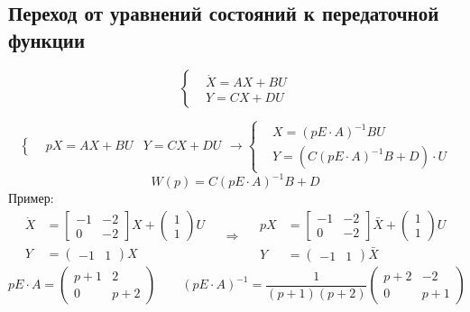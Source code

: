 \subsection{Переход от уравнений состояний к передаточной функции}
\[
  \left\{\begin{aligned} & \dot X = AX + BU \\
  & Y = CX + DU\end{aligned}\right. 
\] 

\[
  \left\{\begin{aligned} & pX = AX + BU
  & Y = CX + DU \end{aligned}\right.  \rightarrow \left\{\begin{aligned} & X =
  (pE \cdot A)^{-1}BU \\ & Y = (C(pE \cdot A)^{-1}B +D)\cdot U \end{aligned}\right. 
\] 
\[
W(p) = C(pE \cdot A)^{-1}B + D
\] 
Пример:
\[
\begin{aligned}
   \dot X &=  \begin{bmatrix} -1 & -2 \\ 0 & -2 \end{bmatrix} X + \begin{pmatrix}
1 \\ 1\end{pmatrix} U \\
   Y &= \begin{pmatrix} -1 & 1 \end{pmatrix} X
\end{aligned}
\quad \Rightarrow \quad
\begin{aligned}
 pX &= \begin{bmatrix} -1 & -2 \\ 0 & -2 \end{bmatrix} \bar X + \begin{pmatrix}
 1 \\ 1 \end{pmatrix} U \\
 Y &= \begin{pmatrix} -1 & 1 \end{pmatrix} \bar X
\end{aligned}
\]
\bigskip
\[
  pE\cdot A = \begin{pmatrix} p+1 & 2 \\ 0 & p+2 \end{pmatrix} \qquad (pE\cdot
  A)^{-1} = \frac{1}{(p+1)(p+2)}\begin{pmatrix} p+2 & -2 \\ 0 & p+1 \end{pmatrix}
\] 
